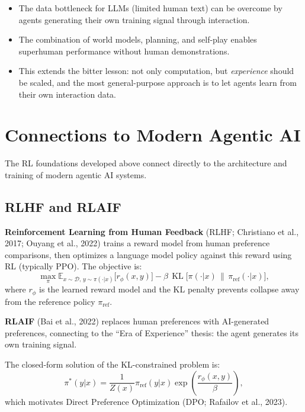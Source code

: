 \documentclass[11pt,a4paper]{article}
\newcommand{\E}{\mathbb{E}}
\newcommand{\cD}{\mathcal{D}}
\DeclareMathOperator{\KL}{KL}
\begin{document}
\begin{itemize}[nosep]
  \item The data bottleneck for LLMs (limited human text) can be overcome by
    agents generating their own training signal through interaction.
  \item The combination of world models, planning, and self-play enables
    superhuman performance without human demonstrations.
  \item This extends the bitter lesson: not only computation, but \emph{experience}
    should be scaled, and the most general-purpose approach is to let agents
    learn from their own interaction data.
\end{itemize}


\section{Connections to Modern Agentic AI}
\label{sec:agentic}

The RL foundations developed above connect directly to the architecture and
training of modern agentic AI systems.

\subsection{RLHF and RLAIF}

\textbf{Reinforcement Learning from Human Feedback} (RLHF; Christiano et al., 2017;
Ouyang et al., 2022) trains a reward model from human preference comparisons,
then optimizes a language model policy against this reward using RL (typically PPO).
The objective is:
\[
  \max_\pi \E_{x \sim \cD,\, y \sim \pi(\cdot|x)}\bigl[r_\phi(x, y)\bigr]
  - \beta\, \KL\!\bigl[\pi(\cdot|x) \,\|\, \pi_{\mathrm{ref}}(\cdot|x)\bigr],
\]
where $r_\phi$ is the learned reward model and the KL penalty prevents
collapse away from the reference policy $\pi_{\mathrm{ref}}$.

\textbf{RLAIF} (Bai et al., 2022) replaces human preferences with AI-generated
preferences, connecting to the ``Era of Experience'' thesis: the agent generates
its own training signal.

The closed-form solution of the KL-constrained problem is:
\[
  \pi^*(y|x) = \frac{1}{Z(x)} \pi_{\mathrm{ref}}(y|x) \exp\!\left(\frac{r_\phi(x,y)}{\beta}\right),
\]
which motivates Direct Preference Optimization (DPO; Rafailov et al., 2023).
\end{document}
